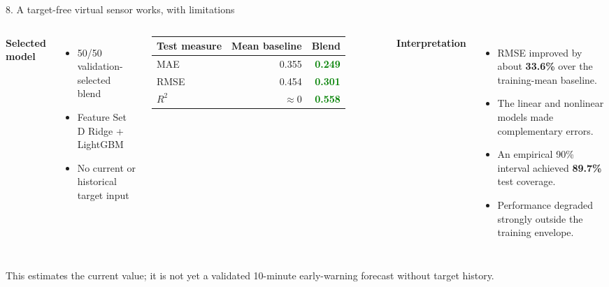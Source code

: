 \documentclass[10pt,aspectratio=169]{beamer}
\newcommand{\good}[1]{\textcolor{Green}{\textbf{#1}}}
\begin{document}
\begin{frame}{8. A target-free virtual sensor works, with limitations}
  \begin{columns}[T,onlytextwidth]
      \textbf{Selected model}
      \begin{itemize}
        \item 50/50 validation-selected blend
        \item Feature Set D Ridge + LightGBM
        \item No current or historical target input
      \end{itemize}
      \vspace{0.15cm}
      \small
      \begin{tabular}{lrr}
        \toprule
        Test measure & Mean baseline & Blend \\
        \midrule
        MAE  & 0.355 & \good{0.249} \\
        RMSE & 0.454 & \good{0.301} \\
        $R^2$ & $\approx 0$ & \good{0.558} \\
        \bottomrule
      \end{tabular}
      \textbf{Interpretation}
      \begin{itemize}
        \item RMSE improved by about \textbf{33.6\%} over the training-mean baseline.
        \item The linear and nonlinear models made complementary errors.
        \item An empirical 90\% interval achieved \textbf{89.7\%} test coverage.
        \item Performance degraded strongly outside the training envelope.
      \end{itemize}
  \end{columns}

  \vfill
  \alert{This estimates the current value; it is not yet a validated 10-minute early-warning forecast without target history.}
\end{frame}
\end{document}
